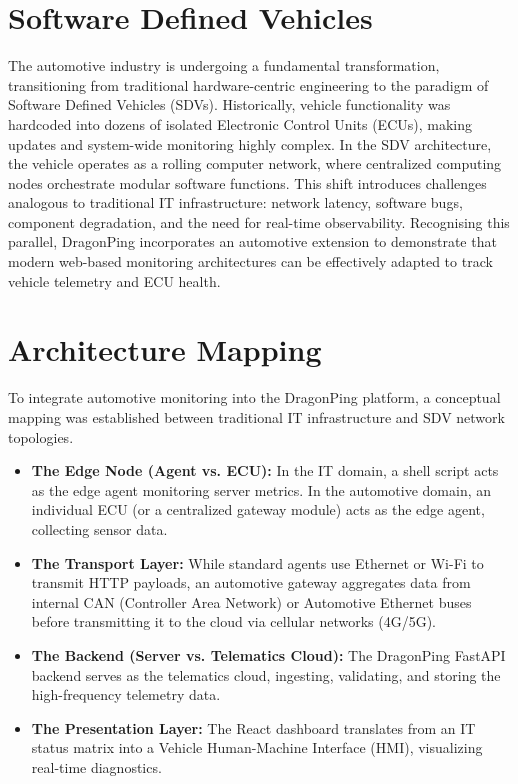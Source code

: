 \documentclass[12pt,a4paper,oneside]{report}
\begin{document}
\section{Software Defined Vehicles}
\noindent The automotive industry is undergoing a fundamental transformation, transitioning from traditional hardware-centric engineering to the paradigm of Software Defined Vehicles (SDVs). Historically, vehicle functionality was hardcoded into dozens of isolated Electronic Control Units (ECUs), making updates and system-wide monitoring highly complex. In the SDV architecture, the vehicle operates as a rolling computer network, where centralized computing nodes orchestrate modular software functions. This shift introduces challenges analogous to traditional IT infrastructure: network latency, software bugs, component degradation, and the need for real-time observability. Recognising this parallel, DragonPing incorporates an automotive extension to demonstrate that modern web-based monitoring architectures can be effectively adapted to track vehicle telemetry and ECU health.

\section{Architecture Mapping}
\noindent To integrate automotive monitoring into the DragonPing platform, a conceptual mapping was established between traditional IT infrastructure and SDV network topologies. 
\begin{itemize}[label=\textbullet, leftmargin=*]
    \item \textbf{The Edge Node (Agent vs. ECU):} In the IT domain, a shell script acts as the edge agent monitoring server metrics. In the automotive domain, an individual ECU (or a centralized gateway module) acts as the edge agent, collecting sensor data.
    \item \textbf{The Transport Layer:} While standard agents use Ethernet or Wi-Fi to transmit HTTP payloads, an automotive gateway aggregates data from internal CAN (Controller Area Network) or Automotive Ethernet buses before transmitting it to the cloud via cellular networks (4G/5G).
    \item \textbf{The Backend (Server vs. Telematics Cloud):} The DragonPing FastAPI backend serves as the telematics cloud, ingesting, validating, and storing the high-frequency telemetry data.
    \item \textbf{The Presentation Layer:} The React dashboard translates from an IT status matrix into a Vehicle Human-Machine Interface (HMI), visualizing real-time diagnostics.
\end{itemize}
\end{document}
